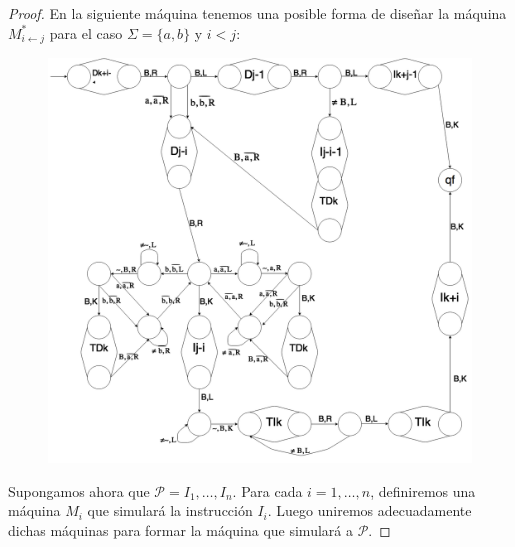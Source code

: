 \begin{proof}
    \pagebreak
    \PN En la siguiente máquina tenemos una posible forma de diseñar la máquina $M_{i\leftarrow j}^{\ast}$ para el caso
    $\Sigma = \{a,b\}$ y $i < j$:

    \begin{figure}[h]
      \centering
      \includegraphics[scale=0.33]{graphics/figure_7.png}
    \end{figure}

    \pagebreak
    \PN Supongamos ahora que $\mathcal{P} = I_{1}, \dotsc, I_{n}$. Para cada $i = 1, \dotsc, n$, definiremos una máquina
    $M_{i}$ que simulará la instrucción $I_{i}$. Luego uniremos adecuadamente dichas máquinas para formar la máquina que
    simulará a $\mathcal{P}$.


\end{proof}
